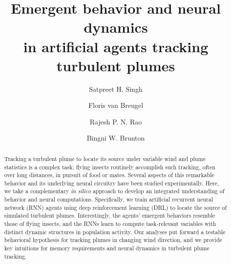 \documentclass[5p,twocolumn,authoryear]{elsarticle}
\providecommand{\DIFdelbegin}{} %
\newcommand{\DIFscaledelfig}{0.5}
\newlength{\DIFdelgraphicswidth} %
\newlength{\DIFdelgraphicsheight} %
\newcommand{\DIFdelincludegraphics}[2][]{%
\sbox{\DIFdelgraphicsbox}{\DIFOincludegraphics[#1]{#2}}%
\settoboxwidth{\DIFdelgraphicswidth}{\DIFdelgraphicsbox} %
\settoboxtotalheight{\DIFdelgraphicsheight}{\DIFdelgraphicsbox} %
\scalebox{\DIFscaledelfig}{%
\parbox[b]{\DIFdelgraphicswidth}{\usebox{\DIFdelgraphicsbox}\\[-\baselineskip] \rule{\DIFdelgraphicswidth}{0em}}\llap{\resizebox{\DIFdelgraphicswidth}{\DIFdelgraphicsheight}{%
\setlength{\unitlength}{\DIFdelgraphicswidth}%
\begin{picture}(1,1)%
\thicklines\linethickness{2pt} %
{\color[rgb]{1,0,0}\put(0,0){\framebox(1,1){}}}%
{\color[rgb]{1,0,0}\put(0,0){\line( 1,1){1}}}%
{\color[rgb]{1,0,0}\put(0,1){\line(1,-1){1}}}%
\end{picture}%
}\hspace*{3pt}}} %
} %
\DeclareRobustCommand{\DIFdelbegin}{\DIFOdelbegin \let\includegraphics\DIFdelincludegraphics} %
\begin{document}
\begin{frontmatter}

\title{
Emergent behavior and neural dynamics \\
in artificial agents tracking turbulent plumes
}

\author[ECE]{Satpreet H. Singh}
\author[UNR]{Floris van Breugel}
\author[CSE,ECE,CNT]{Rajesh P. N. Rao}
\author[Bio,eScience]{Bingni W. Brunton}

\address[ECE]{Department of Electrical and Computer Engineering, University of Washington, Seattle, USA.}
\address[UNR]{Department of Mechanical Engineering, University of Nevada, Reno, USA.}
\address[CSE]{Paul G. Allen School of Computer Science and Engineering, University of Washington, Seattle, USA.}
\address[CNT]{Center for Neurotechnology, University of Washington, Seattle, USA.}
\address[Bio]{Department of Biology, University of Washington, Seattle, USA.}
\address[eScience]{eScience Institute, University of Washington, Seattle, USA.}



\begin{abstract}
\linenumbers
\begin{linenumbers}
Tracking a turbulent plume to locate its source under variable wind and plume statistics is a complex task; flying insects routinely accomplish such tracking, often over long distances, in pursuit of food or mates.
Several aspects of this remarkable behavior and its underlying neural circuitry have been studied experimentally. 
Here, we take a complementary \emph{in silico} approach to develop an integrated understanding of behavior and neural computations.
Specifically, we train artificial recurrent neural network (RNN) agents using deep reinforcement learning (DRL) to locate the source of simulated turbulent plumes.
Interestingly, the agents' emergent behaviors resemble those of flying insects, and the RNNs learn to compute task-relevant variables with distinct dynamic structures in population activity.
Our analyses put forward a testable behavioral hypothesis for tracking plumes in changing wind direction, and we provide key intuitions for memory requirements and neural dynamics in turbulent plume tracking.
\DIFdelbegin %


\end{linenumbers}
\end{abstract}
\end{frontmatter}
\end{document}
